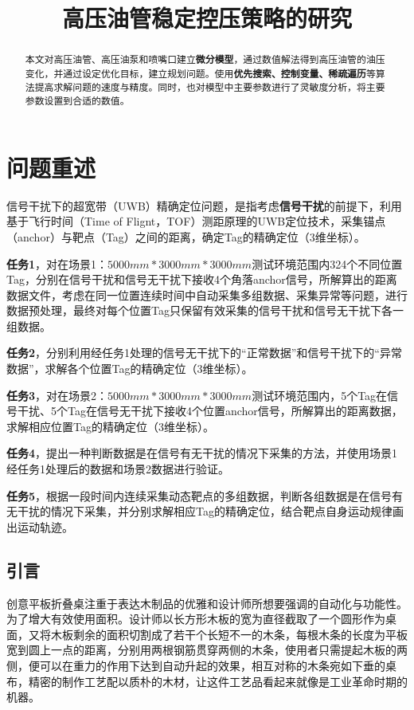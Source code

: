 \documentclass[bwprint]{gmcmthesis}
\title{高压油管稳定控压策略的研究}
\begin{document}
 \maketitle

\begin{abstract}
本文对高压油管、高压油泵和喷嘴口建立\textbf{微分模型}，通过数值解法得到高压油管的油压变化，并通过设定优化目标，建立规划问题。使用\textbf{优先搜索、控制变量、稀疏遍历}等算法提高求解问题的速度与精度。同时，也对模型中主要参数进行了灵敏度分析，将主要参数设置到合适的数值。

\end{abstract}

\pagestyle{plain}


\section{问题重述}
信号干扰下的超宽带（UWB）精确定位问题，是指考虑\textbf{信号干扰}的前提下，利用基于飞行时间（Time of Flignt，TOF）测距原理的UWB定位技术，采集锚点（anchor）与靶点（Tag）之间的距离，确定Tag的精确定位（3维坐标）。

\textbf{任务1}，对在场景1：$5000mm*3000mm*3000mm$测试环境范围内324个不同位置Tag，分别在信号干扰和信号无干扰下接收4个角落anchor信号，所解算出的距离数据文件，考虑在同一位置连续时间中自动采集多组数据、采集异常等问题，进行数据预处理，最终对每个位置Tag只保留有效采集的信号干扰和信号无干扰下各一组数据。

\textbf{任务2}，分别利用经任务1处理的信号无干扰下的“正常数据”和信号干扰下的“异常数据”，求解各个位置Tag的精确定位（3维坐标）。

\textbf{任务3}，对在场景2：$5000mm*3000mm*3000mm$测试环境范围内，5个Tag在信号干扰、5个Tag在信号无干扰下接收4个位置anchor信号，所解算出的距离数据，求解相应位置Tag的精确定位（3维坐标）。

\textbf{任务4}，提出一种判断数据是在信号有无干扰的情况下采集的方法，并使用场景1经任务1处理后的数据和场景2数据进行验证。

\textbf{任务5}，根据一段时间内连续采集动态靶点的多组数据，判断各组数据是在信号有无干扰的情况下采集，并分别求解相应Tag的精确定位，结合靶点自身运动规律画出运动轨迹。

\subsection{引言}
创意平板折叠桌注重于表达木制品的优雅和设计师所想要强调的自动化与功能性。为了增大有效使用面积。设计师以长方形木板的宽为直径截取了一个圆形作为桌面，又将木板剩余的面积切割成了若干个长短不一的木条，每根木条的长度为平板宽到圆上一点的距离，分别用两根钢筋贯穿两侧的木条，使用者只需提起木板的两侧，便可以在重力的作用下达到自动升起的效果，相互对称的木条宛如下垂的桌布，精密的制作工艺配以质朴的木材，让这件工艺品看起来就像是工业革命时期的机器。
\end{document}
